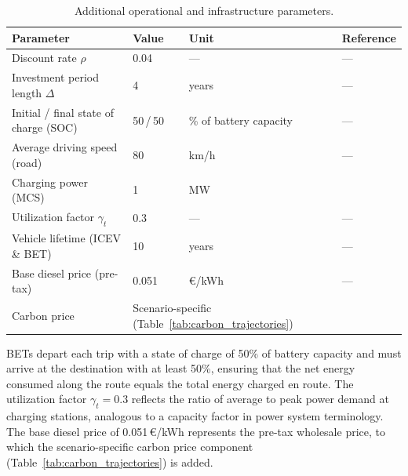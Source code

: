         \begin{table}[H]
            \centering
            \caption{Additional operational and infrastructure parameters.}
            \label{tab:operational_params}
            \begin{tabular}{@{}llll@{}}
            \toprule
            \textbf{Parameter} & \textbf{Value} & \textbf{Unit} & \textbf{Reference} \\ \midrule
            Discount rate $\rho$ & 0.04 & --- & --- \\
            Investment period length $\Delta$ & 4 & years & --- \\
            Initial / final state of charge (SOC) & 50\,/\,50 & \% of battery capacity & --- \\
            Average driving speed (road) & 80 & km/h & --- \\
            Charging power (MCS) & 1 & MW & \citep{en16124704} \\
            Utilization factor $\gamma_t$ & 0.3 & --- & --- \\
            Vehicle lifetime (ICEV \& \ac{BET}) & 10 & years & --- \\
            Base diesel price (pre-tax) & 0.051 & \euro/kWh & --- \\
            Carbon price & \multicolumn{2}{l}{Scenario-specific (Table~\ref{tab:carbon_trajectories})} & \citep{EUEnVis2025} \\
            \bottomrule
            \end{tabular}
        \end{table}

        \acp{BET} depart each trip with a state of charge of 50\% of battery capacity and must arrive at the destination with at least 50\%, ensuring that the net energy consumed along the route equals the total energy charged en route. The utilization factor $\gamma_t = 0.3$ reflects the ratio of average to peak power demand at charging stations, analogous to a capacity factor in power system terminology. The base diesel price of 0.051\,\euro/kWh represents the pre-tax wholesale price, to which the scenario-specific carbon price component (Table~\ref{tab:carbon_trajectories}) is added.

